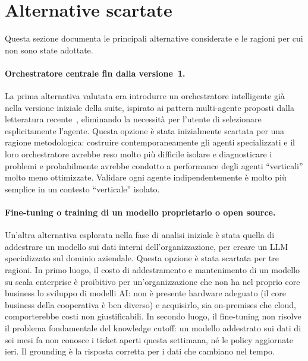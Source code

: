 \section{Alternative scartate}
\label{sec:agenti-alternative}

Questa sezione documenta le principali alternative considerate e le
ragioni per cui non sono state adottate.

\paragraph{Orchestratore centrale fin dalla versione~1.}
La prima alternativa valutata era introdurre un orchestratore
intelligente già nella versione iniziale della suite, ispirato
ai pattern multi-agente proposti dalla letteratura recente~\cite{wu2023autogen,guo2024multiagent,wang2024moa}, eliminando la
necessità per l'utente di selezionare esplicitamente l'agente. Questa
opzione è stata inizialmente scartata per una ragione metodologica: costruire
contemporaneamente gli agenti specializzati e il loro orchestratore
avrebbe reso molto più difficile isolare e diagnosticare i problemi e probabilmente avrebbe 
condotto a performance degli agenti ``verticali'' molto meno ottimizzate.
Validare ogni agente indipendentemente è molto più semplice in un contesto ``verticale'' isolato.

\paragraph{Fine-tuning o training di un modello proprietario o open source.}
Un'altra alternativa esplorata nella fase di analisi iniziale è stata quella di 
addestrare
un modello sui dati interni dell'organizzazione, per creare un LLM
specializzato sul dominio aziendale. 
Questa opzione è stata scartata
per tre ragioni. In primo luogo, il costo di addestramento e
mantenimento di un modello su scala enterprise è proibitivo per
un'organizzazione che non ha nel proprio core business lo sviluppo
di modelli AI: non è presente hardware adeguato (il core business della cooperativa è ben diverso)
e acquisirlo, sia on-premises che cloud, comporterebbe costi non giustificabili.
In secondo luogo, il fine-tuning non risolve il
problema fondamentale del knowledge cutoff: un modello addestrato sui
dati di sei mesi fa non conosce i ticket aperti questa settimana, né
le policy aggiornate ieri. Il grounding è
la risposta corretta per i dati che cambiano nel tempo.




